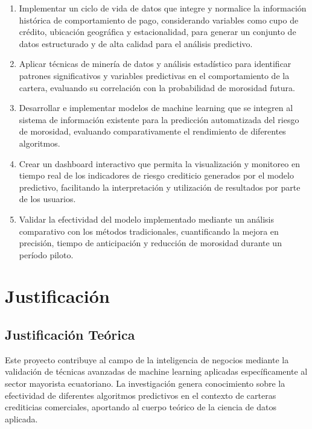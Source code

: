 \begin{enumerate}
    \item Implementar un ciclo de vida de datos que integre y normalice la información histórica de comportamiento de pago, considerando variables como cupo de crédito, ubicación geográfica y estacionalidad, para generar un conjunto de datos estructurado y de alta calidad para el análisis predictivo.
    
    \item Aplicar técnicas de minería de datos y análisis estadístico para identificar patrones significativos y variables predictivas en el comportamiento de la cartera, evaluando su correlación con la probabilidad de morosidad futura.
    
    \item Desarrollar e implementar modelos de machine learning que se integren al sistema de información existente para la predicción automatizada del riesgo de morosidad, evaluando comparativamente el rendimiento de diferentes algoritmos.
    
    \item Crear un dashboard interactivo que permita la visualización y monitoreo en tiempo real de los indicadores de riesgo crediticio generados por el modelo predictivo, facilitando la interpretación y utilización de resultados por parte de los usuarios.
    
    \item Validar la efectividad del modelo implementado mediante un análisis comparativo con los métodos tradicionales, cuantificando la mejora en precisión, tiempo de anticipación y reducción de morosidad durante un período piloto.
\end{enumerate}

\section{Justificación}

\subsection{Justificación Teórica}

Este proyecto contribuye al campo de la inteligencia de negocios mediante la validación de técnicas avanzadas de machine learning aplicadas específicamente al sector mayorista ecuatoriano. La investigación genera conocimiento sobre la efectividad de diferentes algoritmos predictivos en el contexto de carteras crediticias comerciales, aportando al cuerpo teórico de la ciencia de datos aplicada.

